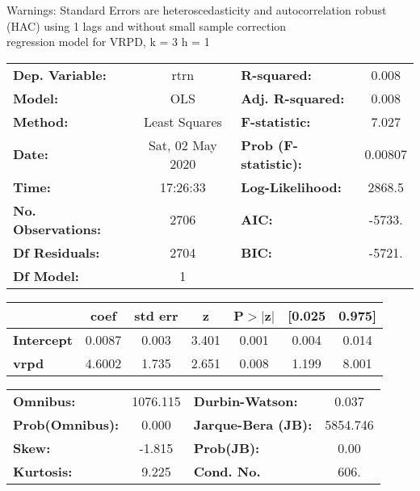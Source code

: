 Warnings: \newline
 [1] Standard Errors are heteroscedasticity and autocorrelation robust (HAC) using 1 lags and without small sample correction\\ 

regression model for VRPD, k = 3 h = 1\begin{center}
\begin{tabular}{lclc}
\toprule
\textbf{Dep. Variable:}    &       rtrn       & \textbf{  R-squared:         } &     0.008   \\
\textbf{Model:}            &       OLS        & \textbf{  Adj. R-squared:    } &     0.008   \\
\textbf{Method:}           &  Least Squares   & \textbf{  F-statistic:       } &     7.027   \\
\textbf{Date:}             & Sat, 02 May 2020 & \textbf{  Prob (F-statistic):} &  0.00807    \\
\textbf{Time:}             &     17:26:33     & \textbf{  Log-Likelihood:    } &    2868.5   \\
\textbf{No. Observations:} &        2706      & \textbf{  AIC:               } &    -5733.   \\
\textbf{Df Residuals:}     &        2704      & \textbf{  BIC:               } &    -5721.   \\
\textbf{Df Model:}         &           1      & \textbf{                     } &             \\
\bottomrule
\end{tabular}
\begin{tabular}{lcccccc}
                   & \textbf{coef} & \textbf{std err} & \textbf{z} & \textbf{P$> |$z$|$} & \textbf{[0.025} & \textbf{0.975]}  \\
\midrule
\textbf{Intercept} &       0.0087  &        0.003     &     3.401  &         0.001        &        0.004    &        0.014     \\
\textbf{vrpd}      &       4.6002  &        1.735     &     2.651  &         0.008        &        1.199    &        8.001     \\
\bottomrule
\end{tabular}
\begin{tabular}{lclc}
\textbf{Omnibus:}       & 1076.115 & \textbf{  Durbin-Watson:     } &    0.037  \\
\textbf{Prob(Omnibus):} &   0.000  & \textbf{  Jarque-Bera (JB):  } & 5854.746  \\
\textbf{Skew:}          &  -1.815  & \textbf{  Prob(JB):          } &     0.00  \\
\textbf{Kurtosis:}      &   9.225  & \textbf{  Cond. No.          } &     606.  \\
\bottomrule
\end{tabular}
\end{center}

